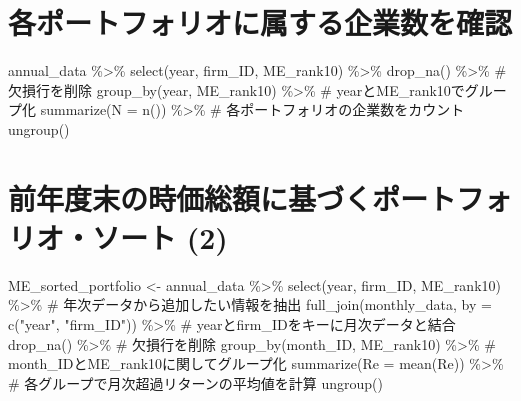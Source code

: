 \documentclass[
  letterpaper,
  DIV=11,
  numbers=noendperiod]{scrreprt}
\newenvironment{Shaded}{\begin{snugshade}}{\end{snugshade}}
\newcommand{\AttributeTok}[1]{\textcolor[rgb]{0.40,0.45,0.13}{#1}}
\newcommand{\CommentTok}[1]{\textcolor[rgb]{0.37,0.37,0.37}{#1}}
\newcommand{\FunctionTok}[1]{\textcolor[rgb]{0.28,0.35,0.67}{#1}}
\newcommand{\NormalTok}[1]{\textcolor[rgb]{0.00,0.23,0.31}{#1}}
\newcommand{\OtherTok}[1]{\textcolor[rgb]{0.00,0.23,0.31}{#1}}
\newcommand{\SpecialCharTok}[1]{\textcolor[rgb]{0.37,0.37,0.37}{#1}}
\newcommand{\StringTok}[1]{\textcolor[rgb]{0.13,0.47,0.30}{#1}}
\begin{document}
\section{各ポートフォリオに属する企業数を確認}\label{ux5404ux30ddux30fcux30c8ux30d5ux30a9ux30eaux30aaux306bux5c5eux3059ux308bux4f01ux696dux6570ux3092ux78baux8a8d}

\begin{Shaded}
\begin{Highlighting}[]
\NormalTok{annual\_data }\SpecialCharTok{\%\textgreater{}\%} 
  \FunctionTok{select}\NormalTok{(year, firm\_ID, ME\_rank10) }\SpecialCharTok{\%\textgreater{}\%} 
  \FunctionTok{drop\_na}\NormalTok{() }\SpecialCharTok{\%\textgreater{}\%} \CommentTok{\# 欠損行を削除}
  \FunctionTok{group\_by}\NormalTok{(year, ME\_rank10) }\SpecialCharTok{\%\textgreater{}\%} \CommentTok{\# yearとME\_rank10でグループ化}
  \FunctionTok{summarize}\NormalTok{(}\AttributeTok{N =} \FunctionTok{n}\NormalTok{()) }\SpecialCharTok{\%\textgreater{}\%} \CommentTok{\# 各ポートフォリオの企業数をカウント}
  \FunctionTok{ungroup}\NormalTok{()}
\end{Highlighting}
\end{Shaded}

\section{前年度末の時価総額に基づくポートフォリオ・ソート
(2)}\label{ux524dux5e74ux5ea6ux672bux306eux6642ux4fa1ux7dcfux984dux306bux57faux3065ux304fux30ddux30fcux30c8ux30d5ux30a9ux30eaux30aaux30bdux30fcux30c8-2}

\begin{Shaded}
\begin{Highlighting}[]
\NormalTok{ME\_sorted\_portfolio }\OtherTok{\textless{}{-}}\NormalTok{ annual\_data }\SpecialCharTok{\%\textgreater{}\%}
  \FunctionTok{select}\NormalTok{(year, firm\_ID, ME\_rank10) }\SpecialCharTok{\%\textgreater{}\%} \CommentTok{\# 年次データから追加したい情報を抽出}
  \FunctionTok{full\_join}\NormalTok{(monthly\_data, }\AttributeTok{by =} \FunctionTok{c}\NormalTok{(}\StringTok{"year"}\NormalTok{, }\StringTok{"firm\_ID"}\NormalTok{)) }\SpecialCharTok{\%\textgreater{}\%} \CommentTok{\# yearとfirm\_IDをキーに月次データと結合}
  \FunctionTok{drop\_na}\NormalTok{() }\SpecialCharTok{\%\textgreater{}\%} \CommentTok{\# 欠損行を削除 }
  \FunctionTok{group\_by}\NormalTok{(month\_ID, ME\_rank10) }\SpecialCharTok{\%\textgreater{}\%} \CommentTok{\# month\_IDとME\_rank10に関してグループ化}
  \FunctionTok{summarize}\NormalTok{(}\AttributeTok{Re =} \FunctionTok{mean}\NormalTok{(Re)) }\SpecialCharTok{\%\textgreater{}\%} \CommentTok{\# 各グループで月次超過リターンの平均値を計算}
  \FunctionTok{ungroup}\NormalTok{()}
\end{Highlighting}
\end{Shaded}
\end{document}
